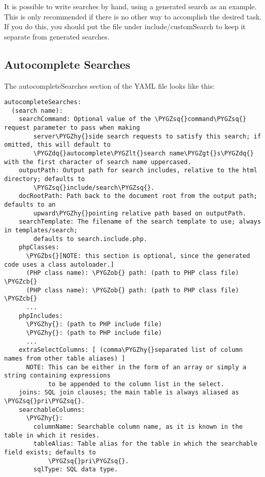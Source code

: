 \documentclass[letterpaper,10pt,english]{sphinxmanual}
\def\PYGZbs{\char`\\}
\def\PYGZob{\char`\{}
\def\PYGZcb{\char`\}}
\def\PYGZlt{\char`\<}
\def\PYGZgt{\char`\>}
\def\PYGZhy{\char`\-}
\def\PYGZsq{\char`\'}
\def\PYGZdq{\char`\"}
\renewcommand\PYGZsq{\textquotesingle}
\begin{document}
It is possible to write searches by hand, using a generated search as an example.  This is only
recommended if there is no other way to accomplish the desired task.  If you do this, you should put
the file under include/customSearch to keep it separate from generated searches.


\subsection{Autocomplete Searches}
\label{jaxFrameworkGuide:autocomplete-searches}
The autocompleteSearches section of the YAML file looks like this:

\begin{Verbatim}[commandchars=\\\{\}]
autocompleteSearches:
  (search name):
    searchCommand: Optional value of the \PYGZsq{}command\PYGZsq{} request parameter to pass when making
        server\PYGZhy{}side search requests to satisfy this search; if omitted, this will default to
        \PYGZdq{}autocomplete\PYGZlt{}search name\PYGZgt{}s\PYGZdq{} with the first character of search name uppercased.
    outputPath: Output path for search includes, relative to the html directory; defaults to
        \PYGZsq{}include/search\PYGZsq{}.
    docRootPath: Path back to the document root from the output path; defaults to an
        upward\PYGZhy{}pointing relative path based on outputPath.
    searchTemplate: The filename of the search template to use; always in templates/search;
        defaults to search.include.php.
    phpClasses:
      \PYGZbs{}[NOTE: this section is optional, since the generated code uses a class autoloader.]
      (PHP class name): \PYGZob{} path: (path to PHP class file) \PYGZcb{}
      (PHP class name): \PYGZob{} path: (path to PHP class file) \PYGZcb{}
      ...
    phpIncludes:
      \PYGZhy{}: (path to PHP include file)
      \PYGZhy{}: (path to PHP include file)
      ...
    extraSelectColumns: [ (comma\PYGZhy{}separated list of column names from other table aliases) ]
      NOTE: This can be either in the form of an array or simply a string containing expressions
            to be appended to the column list in the select.
    joins: SQL join clauses; the main table is always aliased as \PYGZsq{}pri\PYGZsq{}.
    searchableColumns:
      \PYGZhy{}:
        columnName: Searchable column name, as it is known in the table in which it resides.
        tableAlias: Table alias for the table in which the searchable field exists; defaults to
            \PYGZsq{}pri\PYGZsq{}.
        sqlType: SQL data type.

\end{Verbatim}
\end{document}
